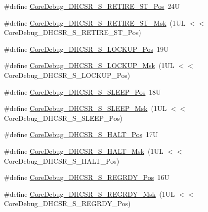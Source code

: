 \begin{DoxyCompactItemize}
\item 
\#define \mbox{\hyperlink{group___c_m_s_i_s___core_debug_ga2328118f8b3574c871a53605eb17e730}{Core\+Debug\+\_\+\+D\+H\+C\+S\+R\+\_\+\+S\+\_\+\+R\+E\+T\+I\+R\+E\+\_\+\+S\+T\+\_\+\+Pos}}~24U
\item 
\#define \mbox{\hyperlink{group___c_m_s_i_s___core_debug_ga89dceb5325f6bcb36a0473d65fbfcfa6}{Core\+Debug\+\_\+\+D\+H\+C\+S\+R\+\_\+\+S\+\_\+\+R\+E\+T\+I\+R\+E\+\_\+\+S\+T\+\_\+\+Msk}}~(1\+U\+L $<$$<$ Core\+Debug\+\_\+\+D\+H\+C\+S\+R\+\_\+\+S\+\_\+\+R\+E\+T\+I\+R\+E\+\_\+\+S\+T\+\_\+\+Pos)
\item 
\#define \mbox{\hyperlink{group___c_m_s_i_s___core_debug_ga2900dd56a988a4ed27ad664d5642807e}{Core\+Debug\+\_\+\+D\+H\+C\+S\+R\+\_\+\+S\+\_\+\+L\+O\+C\+K\+U\+P\+\_\+\+Pos}}~19U
\item 
\#define \mbox{\hyperlink{group___c_m_s_i_s___core_debug_ga7b67e4506d7f464ef5dafd6219739756}{Core\+Debug\+\_\+\+D\+H\+C\+S\+R\+\_\+\+S\+\_\+\+L\+O\+C\+K\+U\+P\+\_\+\+Msk}}~(1\+U\+L $<$$<$ Core\+Debug\+\_\+\+D\+H\+C\+S\+R\+\_\+\+S\+\_\+\+L\+O\+C\+K\+U\+P\+\_\+\+Pos)
\item 
\#define \mbox{\hyperlink{group___c_m_s_i_s___core_debug_ga349ccea33accc705595624c2d334fbcb}{Core\+Debug\+\_\+\+D\+H\+C\+S\+R\+\_\+\+S\+\_\+\+S\+L\+E\+E\+P\+\_\+\+Pos}}~18U
\item 
\#define \mbox{\hyperlink{group___c_m_s_i_s___core_debug_ga98d51538e645c2c1a422279cd85a0a25}{Core\+Debug\+\_\+\+D\+H\+C\+S\+R\+\_\+\+S\+\_\+\+S\+L\+E\+E\+P\+\_\+\+Msk}}~(1\+U\+L $<$$<$ Core\+Debug\+\_\+\+D\+H\+C\+S\+R\+\_\+\+S\+\_\+\+S\+L\+E\+E\+P\+\_\+\+Pos)
\item 
\#define \mbox{\hyperlink{group___c_m_s_i_s___core_debug_ga760a9a0d7f39951dc3f07d01f1f64772}{Core\+Debug\+\_\+\+D\+H\+C\+S\+R\+\_\+\+S\+\_\+\+H\+A\+L\+T\+\_\+\+Pos}}~17U
\item 
\#define \mbox{\hyperlink{group___c_m_s_i_s___core_debug_ga9f881ade3151a73bc5b02b73fe6473ca}{Core\+Debug\+\_\+\+D\+H\+C\+S\+R\+\_\+\+S\+\_\+\+H\+A\+L\+T\+\_\+\+Msk}}~(1\+U\+L $<$$<$ Core\+Debug\+\_\+\+D\+H\+C\+S\+R\+\_\+\+S\+\_\+\+H\+A\+L\+T\+\_\+\+Pos)
\item 
\#define \mbox{\hyperlink{group___c_m_s_i_s___core_debug_ga20a71871ca8768019c51168c70c3f41d}{Core\+Debug\+\_\+\+D\+H\+C\+S\+R\+\_\+\+S\+\_\+\+R\+E\+G\+R\+D\+Y\+\_\+\+Pos}}~16U
\item 
\#define \mbox{\hyperlink{group___c_m_s_i_s___core_debug_gac4cd6f3178de48f473d8903e8c847c07}{Core\+Debug\+\_\+\+D\+H\+C\+S\+R\+\_\+\+S\+\_\+\+R\+E\+G\+R\+D\+Y\+\_\+\+Msk}}~(1\+U\+L $<$$<$ Core\+Debug\+\_\+\+D\+H\+C\+S\+R\+\_\+\+S\+\_\+\+R\+E\+G\+R\+D\+Y\+\_\+\+Pos)
$$
\end{DoxyCompactItemize}
